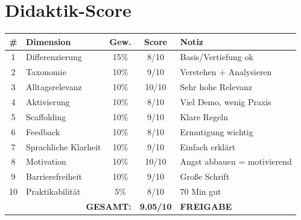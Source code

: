 \documentclass[11pt,a4paper]{article}
\begin{document}
\section{Didaktik-Score}

\begin{scorebox}
\begin{tabular}{|c|l|c|c|p{3.5cm}|}
\hline
\# & Dimension & Gew. & Score & Notiz \\
\hline
1 & Differenzierung & 15\% & 8/10 & Basis/Vertiefung ok \\
2 & Taxonomie & 10\% & 9/10 & Verstehen + Analysieren \\
3 & Alltagsrelevanz & 10\% & 10/10 & Sehr hohe Relevanz \\
4 & Aktivierung & 10\% & 8/10 & Viel Demo, wenig Praxis \\
5 & Scaffolding & 10\% & 9/10 & Klare Regeln \\
6 & Feedback & 10\% & 8/10 & Ermutigung wichtig \\
7 & Sprachliche Klarheit & 10\% & 9/10 & Einfach erklärt \\
8 & Motivation & 10\% & 10/10 & Angst abbauen = motivierend \\
9 & Barrierefreiheit & 10\% & 9/10 & Große Schrift \\
10 & Praktikabilität & 5\% & 8/10 & 70 Min gut \\
\hline
\multicolumn{3}{|r|}{\textbf{GESAMT:}} & \textbf{9.05/10} & \textcolor{successgreen}{\textbf{FREIGABE}} \\
\hline
\end{tabular}
\end{scorebox}
\end{document}
